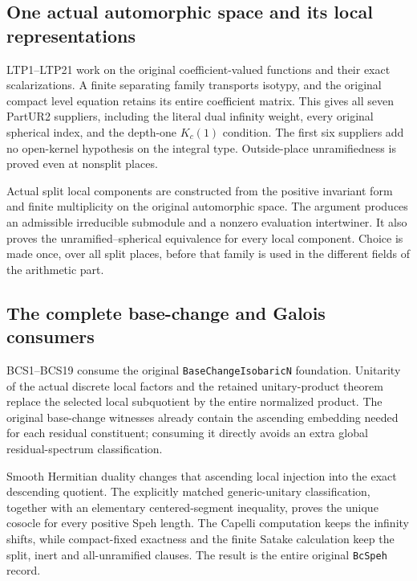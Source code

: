 \subsection{One actual automorphic space and its local representations}

LTP1--LTP21 work on the original coefficient-valued functions and
their exact scalarizations.  A finite separating family transports
isotypy, and the original compact level equation retains its entire
coefficient matrix.  This gives all seven PartUR2 suppliers,
including the literal dual infinity weight, every original
spherical index, and the depth-one $K_c(1)$ condition.
The first six suppliers add no open-kernel hypothesis on the
integral type.  Outside-place unramifiedness is proved even at
nonsplit places.

Actual split local components are constructed from the positive
invariant form and finite multiplicity on the original automorphic
space.  The argument produces an admissible irreducible submodule
and a nonzero evaluation intertwiner.  It also proves the
unramified--spherical equivalence for every local component.
Choice is made once, over all split places, before that family is
used in the different fields of the arithmetic part.

\subsection{The complete base-change and Galois consumers}

BCS1--BCS19 consume the original
\texttt{Base\allowbreak Change\allowbreak Isobaric\allowbreak N} foundation.  Unitarity of the actual
discrete local factors and the retained unitary-product theorem
replace the selected local subquotient by the entire normalized
product.  The original base-change witnesses already contain the
ascending embedding needed for each residual constituent; consuming
it directly avoids an extra global residual-spectrum classification.

Smooth Hermitian duality changes that ascending local injection
into the exact descending quotient.  The explicitly matched
generic-unitary classification, together with an elementary
centered-segment inequality, proves the unique cosocle for every
positive Speh length.  The Capelli computation keeps the infinity
shifts, while compact-fixed exactness and the finite Satake
calculation keep the split, inert and all-unramified clauses.
The result is the entire original \texttt{Bc\allowbreak Speh} record.

